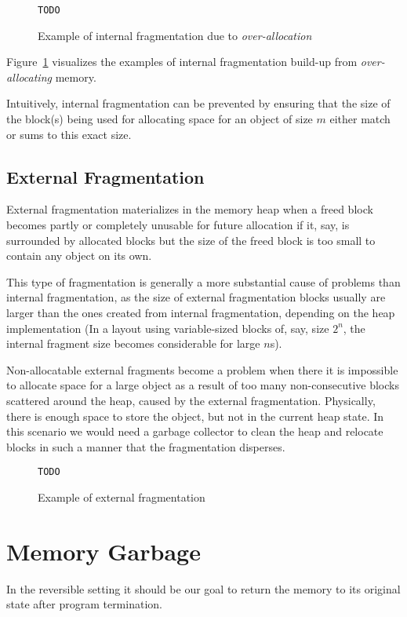 \begin{figure}[ht]
\centering
\texttt{TODO}
\caption{Example of internal fragmentation due to \textit{over-allocation}}
\label{fig:internal-frag-example}
\end{figure}

Figure~\ref{fig:internal-frag-example} visualizes the examples of internal fragmentation build-up from \textit{over-allocating} memory. 

Intuitively, internal fragmentation can be prevented by ensuring that the size of the block(s) being used for allocating space for an object of size $m$ either match or sums to this exact size.

\subsection{External Fragmentation}
External fragmentation materializes in the memory heap when a freed block becomes partly or completely unusable for future allocation if it, say, is surrounded by allocated blocks but the size of the freed block is too small to contain any object on its own.

This type of fragmentation is generally a more substantial cause of problems than internal fragmentation, as the size of external fragmentation blocks usually are larger than the ones created from internal fragmentation, depending on the heap implementation (In a layout using variable-sized blocks of, say, size $2^n$, the internal fragment size becomes considerable for large $n$s). 

Non-allocatable external fragments become a problem when there it is impossible to allocate space for a large object as a result of too many non-consecutive blocks scattered around the heap, caused by the external fragmentation. Physically, there is enough space to store the object, but not in the current heap state. In this scenario we would need a garbage collector to clean the heap and relocate blocks in such a manner that the fragmentation disperses.

\begin{figure}[ht]
\centering
\texttt{TODO}
\caption{Example of external fragmentation}
\label{fig:external-frag-example}
\end{figure}


\section{Memory Garbage}
\label{sec:memory-garbage}
In the reversible setting it should be our goal to return the memory to its original state after program termination.


